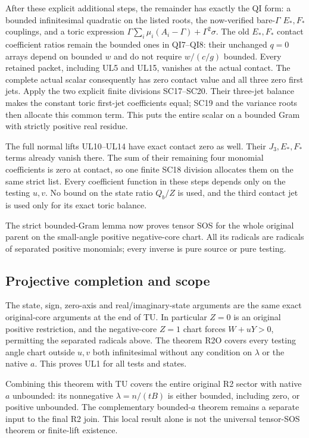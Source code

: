 After these explicit additional steps, the remainder has exactly
the QI form: a bounded infinitesimal quadratic on the listed
roots, the now-verified bare-$\Gamma$ $E_*,F_*$ couplings, and
a toric expression
$\Gamma\sum_i\mu_i(A_i-\Gamma)+\Gamma^2\sigma$.
The old $E_*,F_*$ contact coefficient ratios remain the bounded
ones in QI7--QI8: their unchanged $q=0$ arrays depend on bounded
$w$ and do not require $w/(c/g)$ bounded.
Every retained packet, including UL5 and UL15, vanishes at the
actual contact. The complete actual scalar consequently has zero
contact value and all three zero first jets. Apply the two
explicit finite divisions SC17--SC20. Their three-jet balance
makes the constant toric first-jet coefficients equal; SC19 and
the variance roots then allocate this common term. This puts
the entire scalar on a bounded Gram with strictly positive
real residue.

The full normal lifts UL10--UL14 have exact contact zero as well.
Their $J_3,E_*,F_*$ terms already vanish there. The sum of their
remaining four monomial coefficients is zero at contact, so one
finite SC18 division allocates them on the same strict list.
Every coefficient function in these steps depends only on the
testing $u,v$. No bound on the state ratio $Q_b/Z$ is used, and
the third contact jet is used only for its exact toric balance.

The strict bounded-Gram lemma now proves tensor SOS for the whole
original parent on the small-angle positive negative-core chart.
All its radicals are radicals of separated positive monomials;
every inverse is pure source or pure testing.

\subsection{Projective completion and scope}

The state, sign, zero-axis and real/imaginary-state arguments are
the same exact original-core arguments at the end of TU.
In particular $Z=0$ is an original positive restriction, and the
negative-core $Z=1$ chart forces $W+uY>0$, permitting the
separated radicals above. The theorem R2O covers every testing
angle chart outside $u,v$ both infinitesimal without any
condition on $\lambda$ or the native $a$. This proves UL1 for
all tests and states.

Combining this theorem with TU covers the entire original R2
sector with native $a$ unbounded: its nonnegative
$\lambda=n/(tB)$ is either bounded, including zero, or positive
unbounded. The complementary bounded-$a$ theorem remains a
separate input to the final R2 join. This local result alone is
not the universal tensor-SOS theorem or finite-lift existence.

